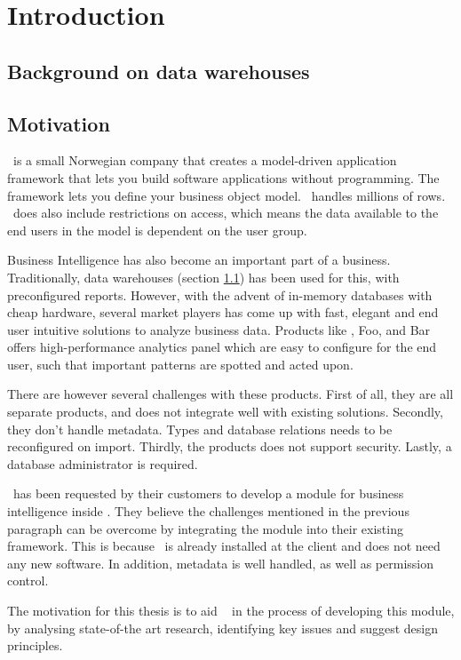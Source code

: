 \chapter{Introduction}
\label{chap:introduction}

\section{Background on data warehouses}
\label{sec:background-data-warehouses}
\lipsum[3]



\section{Motivation}
\genus~is a small Norwegian company that creates a model-driven application framework that lets you build software applications without programming. The framework lets you define your business object model. \genusSoftware~handles millions of rows. \genusSoftware~does also include restrictions on access, which means the data available to the end users in the model is dependent on the user group.

Business Intelligence has also become an important part of a business. Traditionally, data warehouses (section \ref{sec:background-data-warehouses}) has been used for this, with preconfigured reports. However, with the advent of in-memory databases with cheap hardware, several market players has come up with fast, elegant and end user intuitive solutions to analyze business data. Products like \qlikview, Foo, and Bar offers high-performance analytics panel which are easy to configure for the end user, such that important patterns are spotted and acted upon.

There are however several challenges with these products. First of all, they are all separate products, and does not integrate well with existing solutions. Secondly, they don't handle metadata. Types and database relations needs to be reconfigured on import. Thirdly, the products does not support security. Lastly, a database administrator is required.

\genus~has been requested by their customers to develop a module for business intelligence inside \genusSoftware . They believe the challenges mentioned in the previous paragraph can be overcome by integrating the module into their existing framework. This is because \genusSoftware~is already installed at the client and does not need any new software. In addition, metadata is well handled, as well as permission control. 

The motivation for this thesis is to aid \genus~ in the process of developing this module, by analysing state-of-the art research, identifying key issues and suggest design principles.
%

